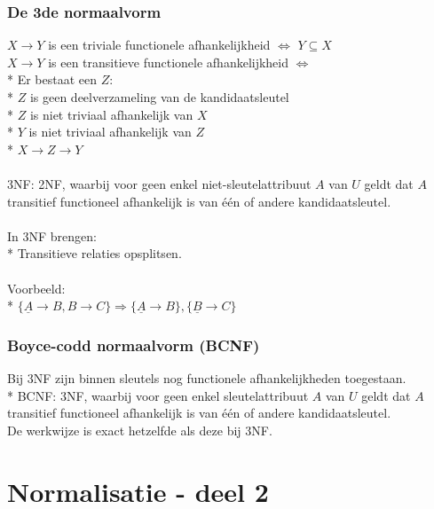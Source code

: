 \documentclass[10pt]{article}
\begin{document}
\subsubsection{De 3de normaalvorm}
$X \rightarrow Y$ is een triviale functionele afhankelijkheid $\Leftrightarrow$ $Y \subseteq X$\\
$X \rightarrow Y$ is een transitieve functionele afhankelijkheid $\Leftrightarrow$\\*
Er bestaat een $Z$:\\*
$Z$ is geen deelverzameling van de kandidaatsleutel\\*
$Z$ is niet triviaal afhankelijk van $X$\\*
$Y$ is niet triviaal afhankelijk van $Z$\\*
$X \rightarrow Z \rightarrow Y$\\\\
3NF: 2NF, waarbij voor geen enkel niet-sleutelattribuut $A$ van $U$ geldt dat $A$ transitief functioneel afhankelijk is van \'e\'en of andere kandidaatsleutel.\\\\
In 3NF brengen:\\*
Transitieve relaties opsplitsen.\\\\
Voorbeeld:\\*
$\{\underline{A} \rightarrow B, B \rightarrow C\} \Rightarrow \{\underline{A} \rightarrow B\}, \{\underline{B} \rightarrow C\}$
\subsubsection{Boyce-codd normaalvorm (BCNF)}
Bij 3NF zijn binnen sleutels nog functionele afhankelijkheden toegestaan.\\*
BCNF: 3NF, waarbij voor geen enkel sleutelattribuut $A$ van $U$ geldt dat $A$ transitief functioneel afhankelijk is van \'e\'en of andere kandidaatsleutel.\\
De werkwijze is exact hetzelfde als deze bij 3NF.
\section{Normalisatie - deel 2}
\end{document}
